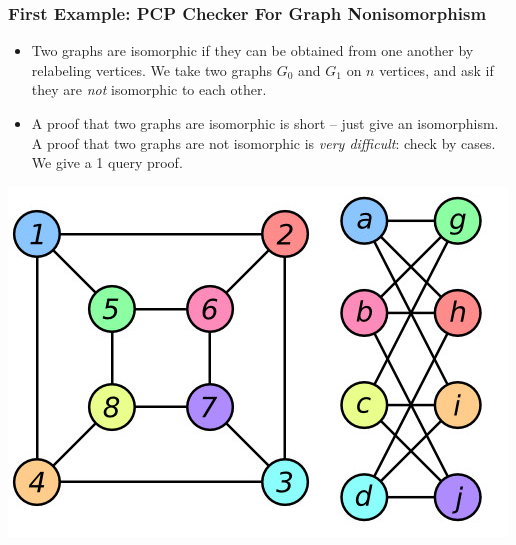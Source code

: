 \documentclass{beamer}
\begin{document}
\begin{frame}
    \frametitle{First Example: PCP Checker For Graph Nonisomorphism}

    \begin{itemize}
        \item Two graphs are isomorphic if they can be obtained from one another by relabeling vertices. We take two graphs $G_0$ and $G_1$ on $n$ vertices, and ask if they are {\it not} isomorphic to each other.

        \item A proof that two graphs are isomorphic is short -- just give an isomorphism. A proof that two graphs are not isomorphic is {\it very difficult}: check by cases. We give a 1 query proof.
    \end{itemize}

    \begin{center}
        \includegraphics[scale=0.3]{graphisomorphism.jpg}\\
    \end{center}

\end{frame}
\end{document}
